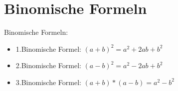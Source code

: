 \newpage
\section{Binomische Formeln}

\hfill \break
Binomische Formeln:
\begin{itemize}
    \item 1.Binomische Formel: $(a+b)^2 = a^2+2ab+b^2$
    \item 2.Binomische Formel: $(a-b)^2 =  a^2-2ab+b^2$
    \item 3.Binomische Formel: $(a+b)*(a-b) = a^2-b^2$
\end{itemize}

\hfill \break

\hfill \break

\hfill \break
